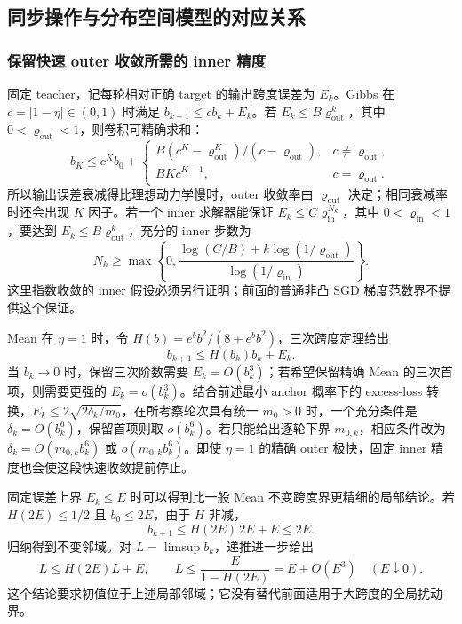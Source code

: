 \subsection{同步操作与分布空间模型的对应关系}

\subsubsection{保留快速 outer 收敛所需的 inner 精度}

固定 teacher，记每轮相对正确 target 的输出跨度误差为 $E_k$。Gibbs 在 $c=|1-\eta|\in(0,1)$ 时满足 $b_{k+1}\le cb_k+E_k$。若 $E_k\le B\varrho_{\mathrm{out}}^k$，其中 $0<\varrho_{\mathrm{out}}<1$，则卷积可精确求和：
\begin{equation*}
 b_K\le c^Kb_0+
 \begin{cases}
 B(c^K-\varrho_{\mathrm{out}}^K)/(c-\varrho_{\mathrm{out}}),&c\ne\varrho_{\mathrm{out}},\\
 BKc^{K-1},&c=\varrho_{\mathrm{out}}.
 \end{cases}
\end{equation*}
所以输出误差衰减得比理想动力学慢时，outer 收敛率由 $\varrho_{\mathrm{out}}$ 决定；相同衰减率时还会出现 $K$ 因子。若一个 inner 求解器能保证 $E_k\le C\varrho_{\mathrm{in}}^{N_k}$，其中 $0<\varrho_{\mathrm{in}}<1$，要达到 $E_k\le B\varrho_{\mathrm{out}}^k$，充分的 inner 步数为
\begin{equation*}
 N_k\ge\max\left\{0,
 \frac{\log(C/B)+k\log(1/\varrho_{\mathrm{out}})}{\log(1/\varrho_{\mathrm{in}})}\right\}.
\end{equation*}
这里指数收敛的 inner 假设必须另行证明；前面的普通非凸 SGD 梯度范数界不提供这个保证。

Mean 在 $\eta=1$ 时，令 $H(b)=e^bb^2/(8+e^bb^2)$，三次跨度定理给出
\begin{equation*}
 b_{k+1}\le H(b_k)b_k+E_k.
\end{equation*}
当 $b_k\to0$ 时，保留三次阶数需要 $E_k=O(b_k^3)$；若希望保留精确 Mean 的三次首项，则需要更强的 $E_k=o(b_k^3)$。结合前述最小 anchor 概率下的 excess-loss 转换，$E_k\le2\sqrt{2\delta_k/m_0}$，在所考察轮次具有统一 $m_0>0$ 时，一个充分条件是 $\delta_k=O(b_k^6)$，保留首项则取 $o(b_k^6)$。若只能给出逐轮下界 $m_{0,k}$，相应条件改为 $\delta_k=O(m_{0,k}b_k^6)$ 或 $o(m_{0,k}b_k^6)$。即使 $\eta=1$ 的精确 outer 极快，固定 inner 精度也会使这段快速收敛提前停止。

固定误差上界 $E_k\le E$ 时可以得到比一般 Mean 不变跨度界更精细的局部结论。若 $H(2E)\le1/2$ 且 $b_0\le2E$，由于 $H$ 非减，
\begin{equation*}
 b_{k+1}\le H(2E)\,2E+E\le2E.
\end{equation*}
归纳得到不变邻域。对 $L=\limsup b_k$，递推进一步给出
\begin{equation*}
 L\le H(2E)L+E,
 \qquad L\le\frac{E}{1-H(2E)}=E+O(E^3)
 \quad(E\downarrow0).
\end{equation*}
这个结论要求初值位于上述局部邻域；它没有替代前面适用于大跨度的全局扰动界。

